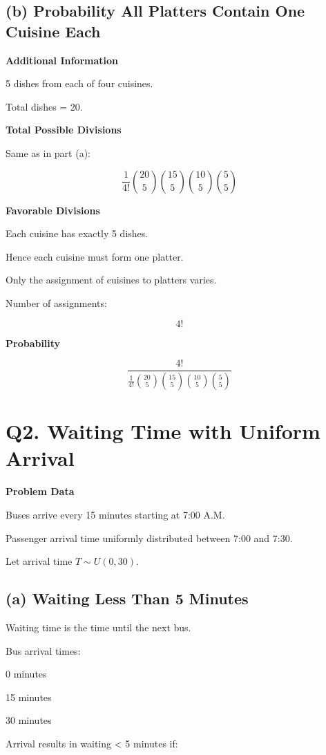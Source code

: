 \documentclass[11pt]{article}
\begin{document}
\subsection*{\textbf{(b) Probability All Platters Contain One Cuisine Each}}

\textbf{Additional Information}

5 dishes from each of four cuisines.

Total dishes = 20.

\textbf{Total Possible Divisions}

Same as in part (a):

\[
\frac{1}{4!}
\binom{20}{5}
\binom{15}{5}
\binom{10}{5}
\binom{5}{5}
\]

\textbf{Favorable Divisions}

Each cuisine has exactly 5 dishes.

Hence each cuisine must form one platter.

Only the assignment of cuisines to platters varies.

Number of assignments:

\[
4!
\]

\textbf{Probability}

\[
\frac{4!}{
\frac{1}{4!}
\binom{20}{5}
\binom{15}{5}
\binom{10}{5}
\binom{5}{5}}
\]

\section*{\textbf{Q2. Waiting Time with Uniform Arrival}}

\textbf{Problem Data}

Buses arrive every 15 minutes starting at 7:00 A.M.

Passenger arrival time uniformly distributed between 7:00 and 7:30.

Let arrival time $T \sim U(0,30)$.

\subsection*{\textbf{(a) Waiting Less Than 5 Minutes}}

Waiting time is the time until the next bus.

Bus arrival times:

0 minutes

15 minutes

30 minutes

Arrival results in waiting < 5 minutes if:
\end{document}
